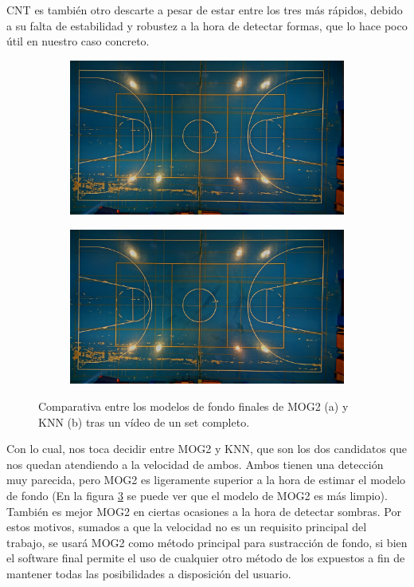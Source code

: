 CNT es también otro descarte a pesar de estar entre los tres más rápidos, debido a su falta de estabilidad y robustez a la hora de detectar formas, que lo hace poco útil en nuestro caso concreto. 

\begin{figure}
\begin{subfigure}{.5\textwidth}
  \centering
  \includegraphics[width=.9\linewidth]{images/modeloMOG}
  \caption { }
  \label{fig:modelos1a}
\end{subfigure}%
\begin{subfigure}{.5\textwidth}
  \centering
  \includegraphics[width=.9\linewidth]{images/modeloKNN}
  \caption { }
  \label{fig:modelos1b}
\end{subfigure}
\caption{Comparativa entre los modelos de fondo finales de MOG2 (a) y KNN (b) tras un vídeo de un set completo. }
\label{fig:modelos}
\end{figure}

Con lo cual, nos toca decidir entre MOG2 y KNN, que son los dos candidatos que nos quedan atendiendo a la velocidad de ambos. Ambos tienen una detección muy parecida, pero MOG2 es ligeramente superior a la hora de estimar el modelo de fondo (En la figura \ref{fig:modelos} se puede ver que el modelo de MOG2 es más limpio). También es mejor MOG2 en ciertas ocasiones a la hora de detectar sombras. Por estos motivos, sumados a que la velocidad no es un requisito principal del trabajo, se usará MOG2 como método principal para sustracción de fondo, si bien el software final permite el uso de cualquier otro método de los expuestos a fin de mantener todas las posibilidades a disposición del usuario.

